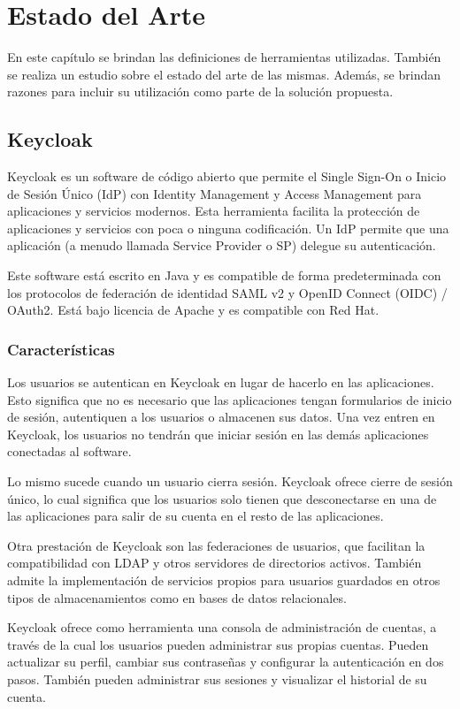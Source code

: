 \chapter{Estado del Arte}\label{chapter:state-of-the-art}
En este capítulo se brindan las definiciones de herramientas utilizadas. También se realiza un estudio sobre el estado del arte de las mismas. Además, se brindan razones para incluir su utilización como parte de la solución propuesta.

\section{Keycloak}
Keycloak es un software de código abierto que permite el Single Sign-On o Inicio de Sesión Único (IdP) con Identity Management y Access Management para aplicaciones y servicios modernos. Esta herramienta facilita la protección de aplicaciones y servicios con poca o ninguna codificación. Un IdP permite que una aplicación (a menudo llamada Service Provider o SP) delegue su autenticación.

Este software está escrito en Java y es compatible de forma predeterminada con los protocolos de federación de identidad SAML v2 y OpenID Connect (OIDC) / OAuth2. Está bajo licencia de Apache y es compatible con Red Hat.

	\subsection{Características}
	Los usuarios se autentican en Keycloak en lugar de hacerlo en las aplicaciones. Esto significa que no es necesario que las aplicaciones tengan formularios de inicio de sesión, autentiquen a los usuarios o almacenen sus datos. Una vez entren en Keycloak, los usuarios no tendrán que iniciar sesión en las demás aplicaciones conectadas al software.
	
	Lo mismo sucede cuando un usuario cierra sesión. Keycloak ofrece cierre de sesión único, lo cual significa que los usuarios solo tienen que desconectarse en una de las aplicaciones para salir de su cuenta en el resto de las aplicaciones.
	
	Otra prestación de Keycloak son las federaciones de usuarios, que facilitan la compatibilidad con LDAP y otros servidores de directorios activos. También admite la implementación de servicios propios para usuarios guardados en otros tipos de almacenamientos como en bases de datos relacionales.
	
	Keycloak ofrece como herramienta una consola de administración de cuentas, a través de la cual los usuarios pueden administrar sus propias cuentas. Pueden actualizar su perfil, cambiar sus contraseñas y configurar la autenticación en dos pasos. También pueden administrar sus sesiones y visualizar el historial de su cuenta.
	
